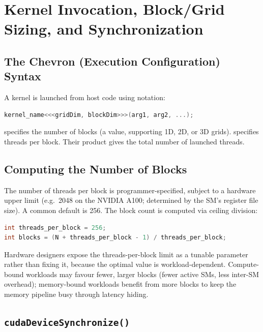 \section{Kernel Invocation, Block/Grid Sizing, and Synchronization}
\label{sec:invocation}

\subsection{The Chevron (Execution Configuration) Syntax}
\label{ssec:chevron}

A kernel is launched from host code using  notation:

\begin{lstlisting}[language=C++]
kernel_name<<<gridDim, blockDim>>>(arg1, arg2, ...);
\end{lstlisting}

 specifies the number of blocks (a  value,
supporting 1D, 2D, or 3D grids).  specifies threads per
block. Their product gives the total number of launched threads.

\subsection{Computing the Number of Blocks}
\label{ssec:num-blocks}

The number of threads per block is programmer-specified, subject to a hardware
upper limit (e.g.\ 2048 on the NVIDIA A100; determined by the SM's register
file size). A common default is 256. The block count is computed via ceiling
division:

\begin{lstlisting}[language=C++]
int threads_per_block = 256;
int blocks = (N + threads_per_block - 1) / threads_per_block;
\end{lstlisting}

\begin{ppnote}
Hardware designers expose the threads-per-block limit as a tunable parameter
rather than fixing it, because the optimal value is workload-dependent.
Compute-bound workloads may favour fewer, larger blocks (fewer active SMs,
less inter-SM overhead); memory-bound workloads benefit from more blocks to
keep the memory pipeline busy through latency hiding.
\end{ppnote}

\subsection{\texttt{cudaDeviceSynchronize()}}
\label{ssec:device-sync}

